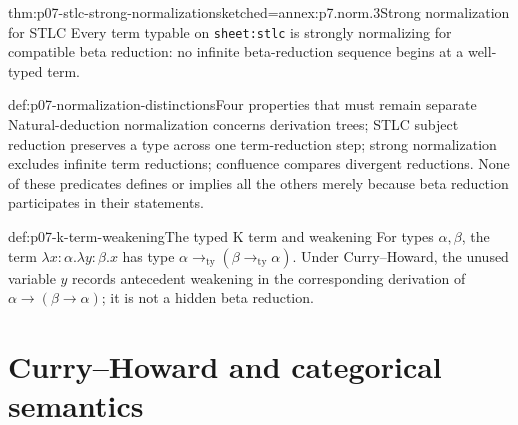 \begin{hbtheorem}{thm:p07-stlc-strong-normalization}{sketched=annex:p7.norm.3}{Strong normalization for STLC}
Every term typable on \texttt{sheet:stlc} is strongly normalizing for
compatible beta reduction: no infinite beta-reduction sequence begins at a
well-typed term.
\end{hbtheorem}

\begin{hbwarning}{def:p07-normalization-distinctions}{Four properties that must remain separate}
Natural-deduction normalization concerns derivation trees; STLC subject
reduction preserves a type across one term-reduction step; strong
normalization excludes infinite term reductions; confluence compares
divergent reductions.  None of these predicates defines or implies all the
others merely because beta reduction participates in their statements.
\end{hbwarning}

\begin{hbexample}{def:p07-k-term-weakening}{The typed K term and weakening}
For types \(\alpha,\beta\), the term
\(\lambda x{:}\alpha.\lambda y{:}\beta.x\) has type
\(\alpha\mathbin{\to_{\mathrm{ty}}}
(\beta\mathbin{\to_{\mathrm{ty}}}\alpha)\).  Under Curry--Howard, the unused
variable \(y\) records antecedent weakening in the corresponding derivation
of \(\alpha\to(\beta\to\alpha)\); it is not a hidden beta reduction.
\end{hbexample}

\section{Curry--Howard and categorical semantics}

